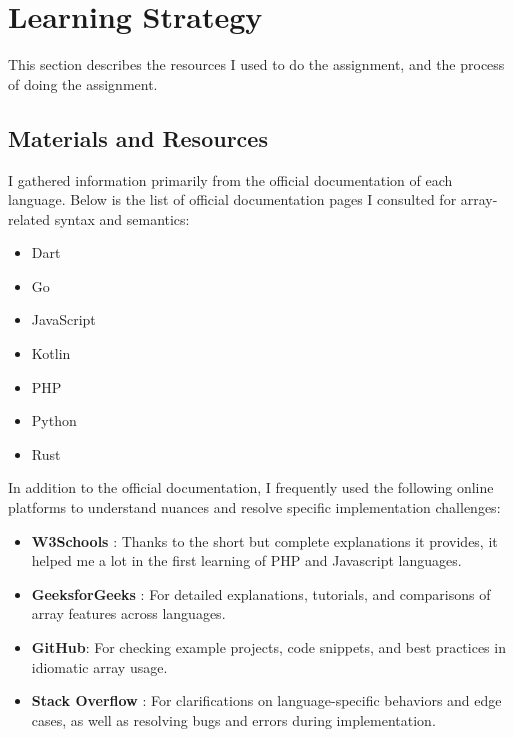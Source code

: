\documentclass{article}
\begin{document}
\newpage

\section{Learning Strategy}

This section describes the resources I used to do the assignment, and the process of doing the assignment.

\subsection{Materials and Resources}

I gathered information primarily from the official documentation of each language. Below is the list of official documentation pages I consulted for array-related syntax and semantics:

\begin{itemize}
    \item Dart \cite{dartdocs}
    \item Go \cite{godocs}
    \item JavaScript \cite{jsdocs}
    \item Kotlin \cite{kotlindocs}
    \item PHP \cite{phpdocs}
    \item Python \cite{pydocs, numpydocs}
    \item Rust \cite{rustdocs}
\end{itemize}

In addition to the official documentation, I frequently used the following online platforms to understand nuances and resolve specific implementation challenges:

\begin{itemize}
    \item \textbf{W3Schools} \cite{w3schools}: Thanks to the short but complete explanations it provides, it helped me a lot in the first learning of PHP and Javascript languages.
    \item \textbf{GeeksforGeeks} \cite{geeksforgeeks}: For detailed explanations, tutorials, and comparisons of array features across languages.
    \item \textbf{GitHub}: \cite{github} For checking example projects, code snippets, and best practices in idiomatic array usage.
    \item \textbf{Stack Overflow} \cite{stackoverflow}: For clarifications on language-specific behaviors and edge cases, as well as resolving bugs and errors during implementation.
\end{itemize}
\end{document}
